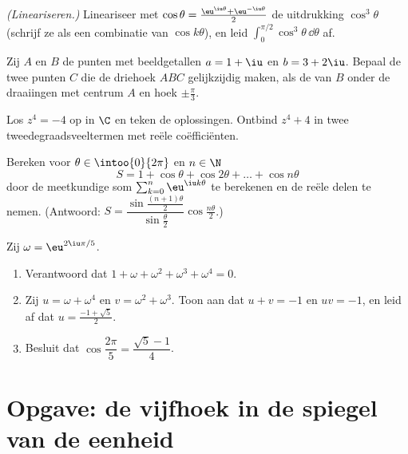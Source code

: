 \begin{exercise}[$\star\star$]\label{exo:g12:complex:6}
\emph{(Lineariseren.)} Lineariseer met
$\cos\theta = \frac{\eu^{\iu\theta} + \eu^{-\iu\theta}}{2}$ de uitdrukking
$\cos^3\theta$ (schrijf ze als een combinatie van $\cos k\theta$), en leid
$\displaystyle\int_0^{\pi/2}\cos^3\theta\,\dd\theta$ af.
\end{exercise}

\begin{exercise}[$\star\star$]\label{exo:g12:complex:7}
Zij $A$ en $B$ de punten met beeldgetallen $a = 1 + \iu$ en $b = 3 + 2\iu$.
Bepaal de twee punten $C$ die de driehoek $ABC$ gelijkzijdig maken, als de
 van $B$ onder de draaiingen met centrum $A$ en hoek
$\pm\frac{\pi}{3}$.
\end{exercise}

\begin{exercise}[$\star\star\star$]\label{exo:g12:complex:8}
Los $z^4 = -4$ op in $\C$ en teken de oplossingen. Ontbind $z^4 + 4$ in twee
tweedegraadsveeltermen met reële coëfficiënten.
\end{exercise}

\begin{exercise}[$\star\star\star$]\label{exo:g12:complex:9}
Bereken voor $\theta \in \intoo{0}{2\pi}$ en $n \in \N$
\[
S = 1 + \cos\theta + \cos 2\theta + \dots + \cos n\theta
\]
door de meetkundige som $\sum_{k=0}^n \eu^{\iu k\theta}$ te berekenen en de
reële delen te nemen. (Antwoord:
$S = \dfrac{\sin\frac{(n+1)\theta}{2}}{\sin\frac{\theta}{2}}
\cos\frac{n\theta}{2}$.)
\end{exercise}

\begin{exercise}[$\star\star\star$]\label{exo:g12:complex:10}
Zij $\omega = \eu^{2\iu\pi/5}$.
\begin{enumerate}
  \item Verantwoord dat $1 + \omega + \omega^2 + \omega^3 + \omega^4 = 0$.
  \item Zij $u = \omega + \omega^4$ en $v = \omega^2 + \omega^3$. Toon aan dat
        $u + v = -1$ en $uv = -1$, en leid af dat $u = \frac{-1+\sqrt5}{2}$.
  \item Besluit dat $\cos\dfrac{2\pi}{5} = \dfrac{\sqrt5 - 1}{4}$.
\end{enumerate}
\end{exercise}

\section{Opgave: de vijfhoek in de spiegel van de eenheid}

